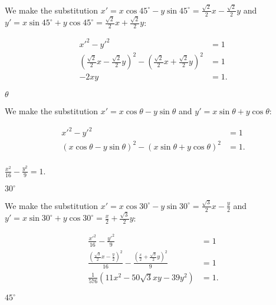 \documentclass[../gatm_answers.tex]{subfiles}
\begin{document}
We make the substitution $x'=x \cos 45^\circ - y\sin 45^\circ=\frac{\sqrt{2}}{2}x-\frac{\sqrt{2}}{2}y$ and $y'=x\sin 45^\circ + y\cos 45^\circ=\frac{\sqrt{2}}{2}x+\frac{\sqrt{2}}{2}y$:

\begin{align*}
x'^2-y'^2 &= 1 \\
\left(\frac{\sqrt{2}}{2}x-\frac{\sqrt{2}}{2}y\right)^2 - \left(\frac{\sqrt{2}}{2}x+\frac{\sqrt{2}}{2}y\right)^2 &= 1 \\
-2xy &= 1.
\end{align*}

\begin{iinner_problem}
\item $\theta$
\end{iinner_problem}

We make the substitution $x'=x \cos \theta - y\sin \theta$ and $y'=x\sin \theta + y\cos \theta$:

\begin{align*}
x'^2-y'^2&=1 \\
(x \cos \theta - y\sin \theta)^2 - (x\sin \theta + y\cos \theta)^2 &= 1. \\
\end{align*}

\begin{inner_problem}
\item $\frac{x^2}{16}-\frac{y^2}{9}=1.$
\end{inner_problem}

\begin{iinner_problem}[start=1]
\item $30^\circ$
\end{iinner_problem}

We make the substitution $x'=x \cos 30^\circ - y\sin 30^\circ=\frac{\sqrt{3}}{2}x-\frac{y}{2}$ and $y'=x\sin 30^\circ + y\cos 30^\circ=\frac{x}{2}+\frac{\sqrt{3}}{2}y$:

\begin{align*}
\frac{x'^2}{16}-\frac{y'^2}{9} &= 1 \\
\frac{\left(\frac{\sqrt{3}}{2}x-\frac{y}{2}\right)^2}{16} - \frac{\left(\frac{x}{2}+\frac{\sqrt{3}}{2}y\right)^2}{9} &= 1 \\
\frac{1}{576} (11 x^2 - 50 \sqrt{3} x y - 39 y^2) &= 1.
\end{align*}

\begin{iinner_problem}
\item $45^\circ$
\end{iinner_problem}
\end{document}
